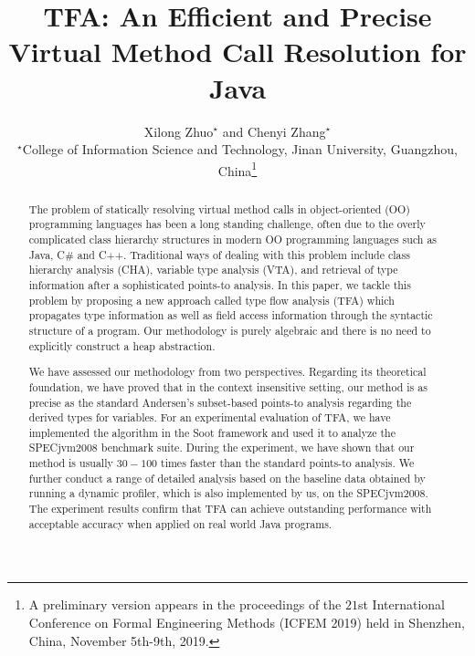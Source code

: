 \documentclass{fac}
\title{TFA: An Efficient and Precise Virtual Method Call Resolution for Java}
\author[Xilong Zhuo and Chenyi Zhang]
    {Xilong Zhuo$^\star$ and Chenyi Zhang$^\star$\\
     $^\star$College of Information Science and Technology, Jinan University, Guangzhou, China\thanks{A preliminary version appears in the proceedings of the $21$st International Conference on Formal Engineering Methods (ICFEM 2019) held in Shenzhen, China, November 5th-9th, 2019.}}
\begin{document}
\label{firstpage}

\makecorrespond

\maketitle

\begin{abstract}
The problem of statically resolving virtual method calls in object-oriented (OO) programming languages has been a long standing challenge, often due to the overly complicated class hierarchy structures in modern OO programming languages such as Java, C$\#$ and C++. Traditional ways of dealing with this problem include class hierarchy analysis (CHA), variable type analysis (VTA), and retrieval of type information after a sophisticated points-to analysis. In this paper, we tackle this problem by proposing a new approach called type flow analysis (TFA) which propagates type information as well as field access information through the syntactic structure of a program. Our methodology is purely algebraic and there is no need to explicitly construct a heap abstraction.

We have assessed our methodology from two perspectives. Regarding its theoretical foundation, we have proved that in the context insensitive setting, our method is as precise as the standard Andersen's subset-based points-to analysis regarding the derived types for variables. For an experimental evaluation of TFA, we have implemented the algorithm in the Soot framework and used it to analyze the SPECjvm2008 benchmark suite. During the experiment, we have shown that our method is usually $30-100$ times faster than the standard points-to analysis. We further conduct a range of detailed analysis based on the baseline data obtained by running a dynamic profiler, which is also implemented by us, on the SPECjvm2008. The experiment results confirm that TFA can achieve outstanding performance with acceptable accuracy when applied on real world Java programs.


\end{abstract}
\end{document}
